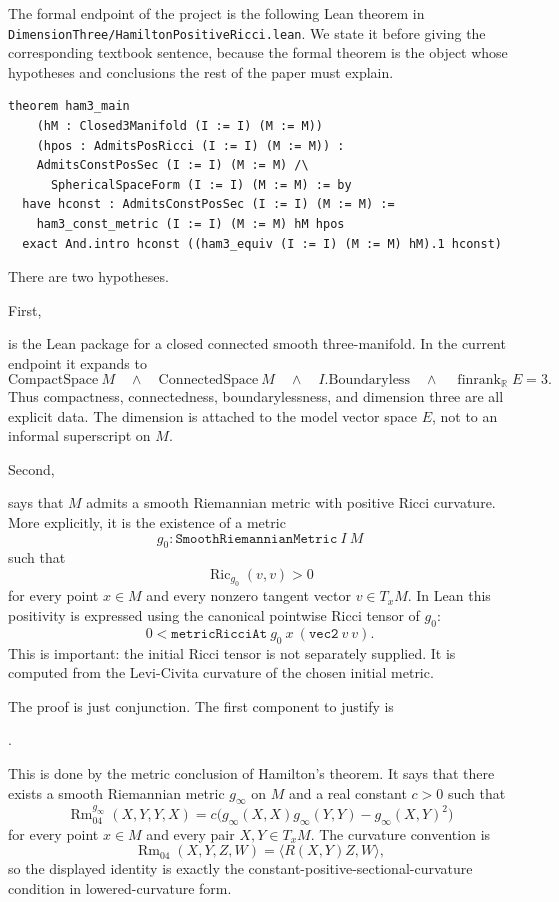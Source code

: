 \documentclass[11pt]{article}
\theoremstyle{plain}
\theoremstyle{definition}
\theoremstyle{remark}
\begin{document}
The formal endpoint of the project is the following Lean theorem in
\texttt{DimensionThree/HamiltonPositiveRicci.lean}.  We state it before giving
the corresponding textbook sentence, because the formal theorem is the object
whose hypotheses and conclusions the rest of the paper must explain.

\begin{verbatim}
theorem ham3_main
    (hM : Closed3Manifold (I := I) (M := M))
    (hpos : AdmitsPosRicci (I := I) (M := M)) :
    AdmitsConstPosSec (I := I) (M := M) /\
      SphericalSpaceForm (I := I) (M := M) := by
  have hconst : AdmitsConstPosSec (I := I) (M := M) :=
    ham3_const_metric (I := I) (M := M) hM hpos
  exact And.intro hconst ((ham3_equiv (I := I) (M := M) hM).1 hconst)
\end{verbatim}



There are two hypotheses.

First,
\begin{center}
\texttt{}
\end{center}
is the Lean package for a closed connected smooth three-manifold.  In the
current endpoint it expands to
\[
  \mathrm{CompactSpace}\ M
  \quad\wedge\quad
  \mathrm{ConnectedSpace}\ M
  \quad\wedge\quad
  I.\mathrm{Boundaryless}
  \quad\wedge\quad
  \operatorname{finrank}_{\mathbb{R}} E = 3.
\]
Thus compactness, connectedness, boundarylessness, and dimension three are all
explicit data.  The dimension is attached to the model vector space \(E\), not
to an informal superscript on \(M\).

Second,
\begin{center}
\texttt{}
\end{center}
says that \(M\) admits a smooth Riemannian metric with positive Ricci
curvature.  More explicitly, it is the existence of a metric
\[
  g_0 : \mathtt{SmoothRiemannianMetric}\ I\ M
\]
such that
\[
  \operatorname{Ric}_{g_0}(v,v)>0
\]
for every point \(x\in M\) and every nonzero tangent vector
\(v\in T_xM\).  In Lean this positivity is expressed using the canonical
pointwise Ricci tensor of \(g_0\):
\[
  0 <
  \mathtt{metricRicciAt}\ g_0\ x\ (\mathtt{vec2}\ v\ v).
\]
This is important: the initial Ricci tensor is not separately supplied.  It is
computed from the Levi-Civita curvature of the chosen initial metric.

The proof is just conjunction.  The first component to justify is
\begin{center}
\texttt{}.
\end{center}
This is done by the metric conclusion of Hamilton's theorem.  It says that there exists a
smooth Riemannian metric \(g_\infty\) on \(M\) and a real constant \(c>0\)
such that
\[
  \operatorname{Rm}_{04}^{g_\infty}(X,Y,Y,X)
  =
  c\bigl(
    g_\infty(X,X)g_\infty(Y,Y)
    -
    g_\infty(X,Y)^2
  \bigr)
\]
for every point \(x\in M\) and every pair \(X,Y\in T_xM\).  The curvature
convention is
\[
  \operatorname{Rm}_{04}(X,Y,Z,W)=\langle R(X,Y)Z,W\rangle,
\]
so the displayed identity is exactly the constant-positive-sectional-curvature
condition in lowered-curvature form.
\end{document}

